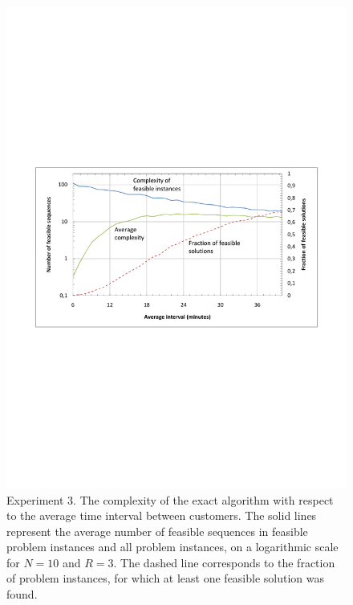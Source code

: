\documentclass[dissertation,draft*]{aaltoseries}
\begin{document}
\begin{figure}[ht]
\begin{center}
\includegraphics[width=1.0\textwidth]{intvertailu01.pdf}
\caption{Experiment 3. The complexity of the exact algorithm with respect to the average time 
interval between customers. The solid lines represent the average number of feasible sequences in
feasible problem instances and all problem instances, on a logarithmic scale for $N=10$ and $R=3$.
The dashed line corresponds to the fraction
of problem instances, for which at least one feasible solution was found.}
\label{intvertailu01}
\end{center}
\end{figure}
\end{document}
